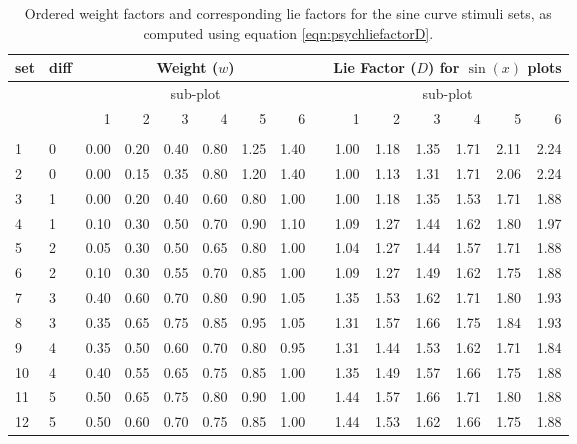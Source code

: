\documentclass[11pt]{isuthesis}\usepackage[]{graphicx}\usepackage[]{color}
\begin{document}
\begin{table}[ht]
\centering
\caption[Weight factor and lie factors for sine stimuli]{\label{tab:w} Ordered weight factors and corresponding lie factors for the sine curve stimuli sets, as computed using equation \ref{eqn:psychliefactorD}.}
\begin{tabular}{llrrrrrrlrrrrrr}
  \hline
set\vphantom{hp}& diff & \multicolumn{6}{c}{Weight ($w$)} & & \multicolumn{6}{c}{Lie Factor ($D$) for $\sin(x)$ plots}\\ 
\hline
& & \multicolumn{6}{c}{sub-plot} & & \multicolumn{6}{c}{sub-plot}\\ 
    & & 1 & 2 & 3 & 4 & 5 & 6  & & 1 & 2 & 3 & 4 & 5 & 6  \\ 
    \cline{3-8} \cline{10-15}\\ [-1.75ex]
  1 & 0 & 0.00 & 0.20 & 0.40 & 0.80 & 1.25 & 1.40 &       & 1.00 & 1.18 & 1.35 & 1.71 & 2.11 & 2.24 \\ 
  2 & 0 & 0.00 & 0.15 & 0.35 & 0.80 & 1.20 & 1.40 &       & 1.00 & 1.13 & 1.31 & 1.71 & 2.06 & 2.24 \\ 
  3 & 1 & 0.00 & 0.20 & 0.40 & 0.60 & 0.80 & 1.00 &       & 1.00 & 1.18 & 1.35 & 1.53 & 1.71 & 1.88 \\ 
  4 & 1 & 0.10 & 0.30 & 0.50 & 0.70 & 0.90 & 1.10 &       & 1.09 & 1.27 & 1.44 & 1.62 & 1.80 & 1.97 \\ 
  5 & 2 & 0.05 & 0.30 & 0.50 & 0.65 & 0.80 & 1.00 &       & 1.04 & 1.27 & 1.44 & 1.57 & 1.71 & 1.88 \\ 
  6 & 2 & 0.10 & 0.30 & 0.55 & 0.70 & 0.85 & 1.00 &       & 1.09 & 1.27 & 1.49 & 1.62 & 1.75 & 1.88 \\ 
  7 & 3 & 0.40 & 0.60 & 0.70 & 0.80 & 0.90 & 1.05 &       & 1.35 & 1.53 & 1.62 & 1.71 & 1.80 & 1.93 \\ 
  8 & 3 & 0.35 & 0.65 & 0.75 & 0.85 & 0.95 & 1.05 &       & 1.31 & 1.57 & 1.66 & 1.75 & 1.84 & 1.93 \\ 
  9 & 4 & 0.35 & 0.50 & 0.60 & 0.70 & 0.80 & 0.95 &       & 1.31 & 1.44 & 1.53 & 1.62 & 1.71 & 1.84 \\ 
  10 & 4 & 0.40 & 0.55 & 0.65 & 0.75 & 0.85 & 1.00 &       & 1.35 & 1.49 & 1.57 & 1.66 & 1.75 & 1.88 \\ 
  11 & 5 & 0.50 & 0.65 & 0.75 & 0.80 & 0.90 & 1.00 &       & 1.44 & 1.57 & 1.66 & 1.71 & 1.80 & 1.88 \\ 
  12 & 5 & 0.50 & 0.60 & 0.70 & 0.75 & 0.85 & 1.00 &       & 1.44 & 1.53 & 1.62 & 1.66 & 1.75 & 1.88 \\ 
   \hline
\end{tabular}
\end{table}
\end{document}

